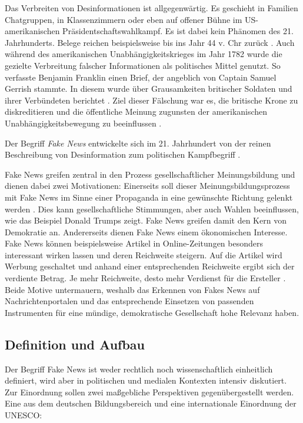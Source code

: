 Das Verbreiten von Desinformationen ist allgegenwärtig. Es geschieht in Familien Chatgruppen, in Klassenzimmern oder eben auf offener Bühne im US-amerikanischen 
Präsidentschaftswahlkampf. Es ist dabei kein Phänomen des 21. Jahrhunderts. Belege reichen beispielsweise bis ins Jahr 44 v. Chr zurück \cite{socsci9100185}.
Auch während des amerikanischen Unabhängigkeitskrieges im Jahr 1782 wurde die gezielte Verbreitung falscher Informationen als politisches Mittel genutzt. 
So verfasste Benjamin Franklin einen Brief, der angeblich von Captain Samuel Gerrish stammte. In diesem wurde über Grausamkeiten britischer Soldaten und ihrer 
Verbündeten berichtet \cite{Franklin1782}. Ziel dieser Fälschung war es, die britische Krone zu diskreditieren und die öffentliche Meinung zugunsten der amerikanischen 
Unabhängigkeitsbewegung zu beeinflussen \cite{Sharma:2024}.

Der Begriff \textit{Fake News} entwickelte sich im 21. Jahrhundert von der reinen Beschreibung von Desinformation zum politischen Kampfbegriff \cite{Ashish2024, buerker2022fakenews}.

Fake News greifen zentral in den Prozess gesellschaftlicher Meinungsbildung und dienen dabei zwei Motivationen: 
Einerseits soll dieser Meinungsbildungsprozess mit Fake News im Sinne einer Propaganda in eine gewünschte Richtung gelenkt werden \cite{buerker2022fakenews}. 
Dies kann gesellschaftliche Stimmungen, aber auch Wahlen beeinflussen, wie das Beispiel Donald Trumps zeigt. Fake News greifen damit den Kern von Demokratie an. 
Andererseits dienen Fake News einem ökonomischen Interesse. Fake News können beispielsweise Artikel in Online-Zeitungen besonders interessant wirken lassen 
und deren Reichweite steigern. Auf die Artikel wird Werbung geschaltet und anhand einer entsprechenden Reichweite ergibt sich der verdiente Betrag. Je mehr Reichweite, desto mehr 
Verdienst für die Ersteller \cite{socsci9100185}. 
Beide Motive untermauern, weshalb das Erkennen von Fakes News auf Nachrichtenportalen und das entsprechende Einsetzen von passenden Instrumenten für eine mündige, demokratische Gesellschaft hohe Relevanz haben. 

\subsection{Definition und Aufbau}
\label{sec:wie_definieren_sich_fake_news}

Der Begriff Fake News ist weder rechtlich noch wissenschaftlich einheitlich definiert, wird aber in politischen und medialen Kontexten intensiv diskutiert. 
Zur Einordnung sollen zwei maßgebliche Perspektiven gegenübergestellt werden. Eine aus dem deutschen Bildungsbereich und eine internationale Einordnung der UNESCO:

